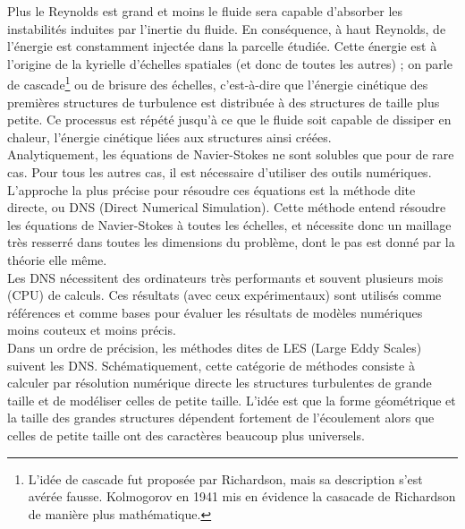 \documentclass[a4paper,12pt]{article}
\newcommand{\cad}{c'est-à-dire}
\newcommand{\NS}{Navier-Stokes}
\numberwithin{equation}{section} %
\begin{document}
\noindent Plus le Reynolds est grand et moins le fluide sera capable d'absorber les instabilités induites par l'inertie du fluide. En conséquence, à haut Reynolds, de l'énergie est constamment injectée dans la parcelle étudiée. Cette énergie est à l'origine de la kyrielle d'échelles spatiales (et donc de toutes les autres) ; on parle de cascade\footnote{L'idée de cascade fut proposée par Richardson, mais sa description s'est avérée fausse. Kolmogorov en 1941 mis en évidence la casacade de Richardson de manière plus mathématique.} ou de brisure des échelles, \cad $ $ que l'énergie cinétique des premières structures de turbulence est distribuée à des structures de taille plus petite. Ce processus est répété jusqu'à ce que le fluide soit capable de dissiper en chaleur, l'énergie cinétique liées aux structures ainsi créées. \\

\noindent Analytiquement, les équations de \NS $ $ ne sont solubles que pour de rare cas. Pour tous les autres cas, il est nécessaire d'utiliser des outils numériques.\\
L'approche la plus précise pour résoudre ces équations est la méthode dite directe, ou DNS (Direct Numerical Simulation). Cette méthode entend résoudre les équations de \NS $ $ à toutes les échelles, et nécessite donc un maillage très resserré dans toutes les dimensions du problème, dont le pas est donné par la théorie elle même. \\
Les DNS nécessitent des ordinateurs très performants et souvent plusieurs mois (CPU) de calculs. Ces résultats (avec ceux expérimentaux) sont utilisés comme références et comme bases pour évaluer les résultats de modèles numériques moins couteux et moins précis.\\
Dans un ordre de précision, les méthodes dites de LES (Large Eddy Scales) suivent les DNS. Schématiquement, cette catégorie de méthodes consiste à calculer par résolution numérique directe les structures turbulentes de grande taille et de modéliser celles de petite taille. L'idée est que la forme géométrique et la taille des grandes structures dépendent fortement de l'écoulement alors que celles de petite taille ont des caractères beaucoup plus universels.\\
\end{document}
